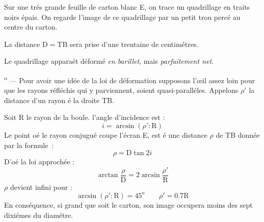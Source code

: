 \documentclass[fontsize=11pt,english,BCOR=10mm,DIV=12,bibliography=totoc,parskip=false,headings=small,
    headinclude=false,footinclude=false,oneside]{pst-doc}
\newcounter{boua}
\newcommand\itemBoua{\addtocounter{boua}{1}\strut\indent\textit{\theboua}\textsuperscript{o} --- }
\begin{document}
Sur une trés grande feuille de carton blanc E, on trace un
quadrillage en traits noirs épais. On regarde l'image de ce
quadrillage par un petit trou percé au centre du carton.

La distance $\mathrm{D=TB}$ sera prise d'une trentaine de
centimétres.

Le quadrillage apparaét déformé \textit{en barillet}, mais
\textit{parfaitement net}.

\itemBoua
Pour avoir une idée de la loi de déformation supposons l'\oe{}il
assez loin pour que les rayons réfléchis qui y parviennent, soient
quasi-paralléles. Appelons $\rho'$ la distance d'un rayon é la
droite TB.

Soit R le rayon de la boule. l'angle d'incidence est :
$$i=\arcsin(\rho':\mathrm{R})$$
Le point oé le rayon conjugué coupe l'écran E, est é une distance
$\rho$ de TB donnée par la formule~:
$$\rho=\mathrm{D}\tan2i$$
D'oé la loi approchée :
$$\arctan\frac{\rho}{\mathrm{D}}=2\arcsin\frac{\rho'}{\mathrm{R}}$$
$\rho$ devient infini pour :
$$\arcsin(\rho':\mathrm{R})=45^\mathrm{o}\qquad \rho'=0.7\mathrm{R}$$
En conséquence, si grand que soit le carton, son image occupera
moins des sept dixiémes du diamétre.
\end{document}
